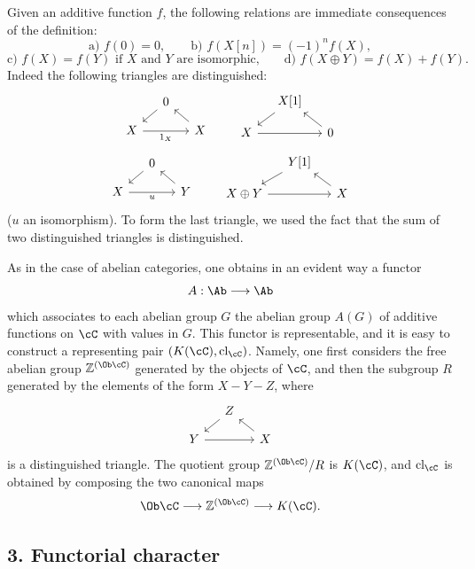 Given an additive function $f$, the following relations are immediate consequences of the definition:
\[
\text{a) } f(0)=0,\qquad
\text{b) } f(X[n])=(-1)^n f(X),
\]
\[
\text{c) } f(X)=f(Y)\text{ if }X\text{ and }Y\text{ are isomorphic,}
\qquad
\text{d) } f(X\oplus Y)=f(X)+f(Y).
\]
Indeed the following triangles are distinguished:
\[
\begin{tikzcd}[column sep=small,row sep=small]
&0 \arrow[dl]\\ X \arrow[rr,"1_X"']&&X\arrow[ul]
\end{tikzcd}
\qquad
\begin{tikzcd}[column sep=small,row sep=small]
&X[1]\arrow[dl]\\ X\arrow[rr]&&0\arrow[ul]
\end{tikzcd}
\]
\[
\begin{tikzcd}[column sep=small,row sep=small]
&0\arrow[dl]\\ X\arrow[rr,"u"']&&Y\arrow[ul]
\end{tikzcd}
\qquad
\begin{tikzcd}[column sep=small,row sep=small]
&Y[1]\arrow[dl]\\ X\oplus Y\arrow[rr]&&X\arrow[ul]
\end{tikzcd}
\]
($u$ an isomorphism). To form the last triangle, we used the fact that the sum of two distinguished triangles is distinguished.

As in the case of abelian categories, one obtains in an evident way a functor
\[
A:\Ab\longrightarrow\Ab
\]
which associates to each abelian group $G$ the abelian group $A(G)$ of additive functions on $\cC$ with values in $G$. This functor is representable, and it is easy to construct a representing pair $(K(\cC),\operatorname{cl}_{\cC})$. Namely, one first considers the free abelian group $\mathbb Z^{(\Ob\cC)}$ generated by the objects of $\cC$, and then the subgroup $R$ generated by the elements of the form $X-Y-Z$, where
\[
\begin{tikzcd}[column sep=small,row sep=small]
&Z\arrow[dl]\\ Y\arrow[rr]&&X\arrow[ul]
\end{tikzcd}
\]
is a distinguished triangle. The quotient group $\mathbb Z^{(\Ob\cC)}/R$ is $K(\cC)$, and $\operatorname{cl}_{\cC}$ is obtained by composing the two canonical maps
\[
\Ob\cC\longrightarrow \mathbb Z^{(\Ob\cC)}\longrightarrow K(\cC).
\]

\subsection*{3. Functorial character}

